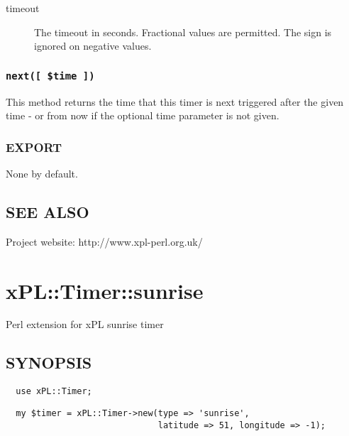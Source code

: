 \begin{description}

\item[{timeout}] \mbox{}

The timeout in seconds.  Fractional values are permitted.  The sign is
ignored on negative values.

\end{description}
\subsubsection*{\texttt{next([ \$time ])}\label{xPL::Timer::simple_next_time_}}


This method returns the time that this timer is next triggered after
the given time - or from now if the optional time parameter is not
given.

\subsubsection*{EXPORT\label{xPL::Timer::simple_EXPORT}}


None by default.

\subsection*{SEE ALSO\label{xPL::Timer::simple_SEE_ALSO}}


Project website: http://www.xpl-perl.org.uk/

\section{xPL::Timer::sunrise\label{xPL::Timer::sunrise}}


Perl extension for xPL sunrise timer

\subsection*{SYNOPSIS\label{xPL::Timer::sunrise_SYNOPSIS}}
\begin{verbatim}
  use xPL::Timer;
\end{verbatim}
\begin{verbatim}
  my $timer = xPL::Timer->new(type => 'sunrise',
                              latitude => 51, longitude => -1);
\end{verbatim}
